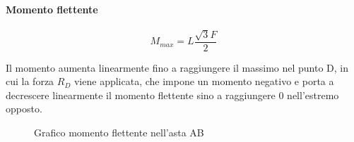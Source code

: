 \documentclass[main.tex]{subfiles}
\begin{document}
\paragraph{Momento flettente}

\[
	M_{max} = L\dfrac{\sqrt{3}F}{2}
\]

Il momento aumenta linearmente fino a raggiungere il massimo nel punto D, in cui la forza $R_D$ viene applicata, che impone un momento negativo e porta a decrescere linearmente il momento flettente sino a raggiungere 0 nell'estremo opposto.

\begin{figure}[H]
\centering
\resizebox{.3\textwidth}{!}{}
\caption{Grafico momento flettente nell'asta AB}
\end{figure}
\end{document}

